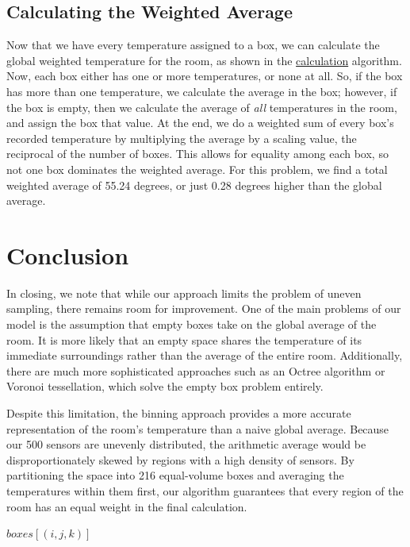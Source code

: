 \documentclass[12pt]{article}
\newcommand{\Z}{\mathbb{Z}}
\begin{document}
\subsection{Calculating the Weighted Average}

Now that we have every temperature assigned to a box, we can calculate the global weighted temperature for the room, as shown in the \hyperref[calc]{calculation} algorithm. Now, each box either has one or more temperatures, or none at all. So, if the box has more than one temperature, we calculate the average in the box; however, if the box is empty, then we calculate the average of \textit{all} temperatures in the room, and assign the box that value. At the end, we do a weighted sum of every box's recorded temperature by multiplying the average by a scaling value, the reciprocal of the number of boxes. This allows for equality among each box, so not one box dominates the weighted average. For this problem, we find a total weighted average of 55.24 degrees, or just 0.28 degrees higher than the global average.

\section{Conclusion}

In closing, we note that while our approach limits the problem of uneven sampling, there remains room for improvement. One of the main problems of our model is the assumption that empty boxes take on the global average of the room. It is more likely that an empty space shares the temperature of its immediate surroundings rather than the average of the entire room. Additionally, there are much more sophisticated approaches such as an Octree algorithm or Voronoi tessellation, which solve the empty box problem entirely.

Despite this limitation, the binning approach provides a more accurate representation of the room's temperature than a naive global average. Because our 500 sensors are unevenly distributed, the arithmetic average would be disproportionately skewed by regions with a high density of sensors. By partitioning the space into 216 equal-volume boxes and averaging the temperatures within them first, our algorithm guarantees that every region of the room has an equal weight in the final calculation.


\newpage
\vfill

\begin{algorithm}[h!]
    \caption{Partition initialization}
    \label{init}
    \begin{algorithmic}[1] %
         
         \Comment{\(n_{bins} \in \Z^{+}\)}
                    \State \(boxes[(i, j, k)]\)
                \EndFor
            \EndFor
        \EndFor
        \EndProcedure
    \end{algorithmic}
\end{algorithm}
\end{document}
